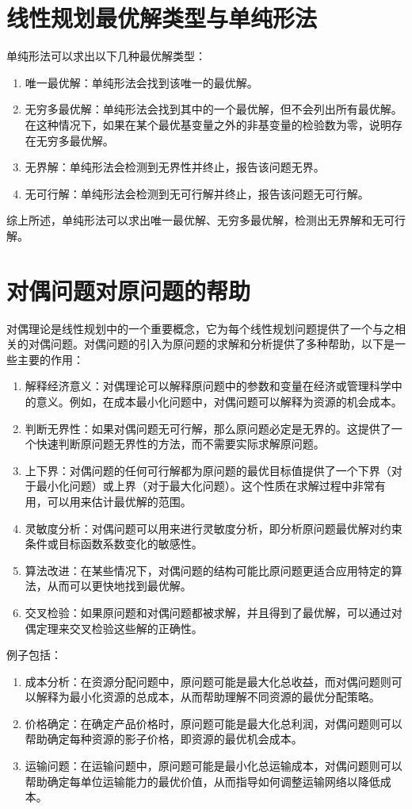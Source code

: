 \documentclass[12pt, a4paper, oneside]{ctexart}
\begin{document}
\section{线性规划最优解类型与单纯形法}
单纯形法可以求出以下几种最优解类型：

\begin{enumerate}[(1)]
  \item 唯一最优解：单纯形法会找到该唯一的最优解。
  \item 无穷多最优解：单纯形法会找到其中的一个最优解，但不会列出所有最优解。在这种情况下，如果在某个最优基变量之外的非基变量的检验数为零，说明存在无穷多最优解。
  \item 无界解：单纯形法会检测到无界性并终止，报告该问题无界。
  \item 无可行解：单纯形法会检测到无可行解并终止，报告该问题无可行解。
\end{enumerate}
综上所述，单纯形法可以求出唯一最优解、无穷多最优解，检测出无界解和无可行解。

\section{对偶问题对原问题的帮助}
对偶理论是线性规划中的一个重要概念，它为每个线性规划问题提供了一个与之相关的对偶问题。对偶问题的引入为原问题的求解和分析提供了多种帮助，以下是一些主要的作用：

\begin{enumerate}[(1)]
  \item 解释经济意义：对偶理论可以解释原问题中的参数和变量在经济或管理科学中的意义。例如，在成本最小化问题中，对偶问题可以解释为资源的机会成本。
  \item 判断无界性：如果对偶问题无可行解，那么原问题必定是无界的。这提供了一个快速判断原问题无界性的方法，而不需要实际求解原问题。
  \item 上下界：对偶问题的任何可行解都为原问题的最优目标值提供了一个下界（对于最小化问题）或上界（对于最大化问题）。这个性质在求解过程中非常有用，可以用来估计最优解的范围。
  \item 灵敏度分析：对偶问题可以用来进行灵敏度分析，即分析原问题最优解对约束条件或目标函数系数变化的敏感性。
  \item 算法改进：在某些情况下，对偶问题的结构可能比原问题更适合应用特定的算法，从而可以更快地找到最优解。
  \item 交叉检验：如果原问题和对偶问题都被求解，并且得到了最优解，可以通过对偶定理来交叉检验这些解的正确性。
\end{enumerate}
例子包括：

\begin{enumerate}[(1)]
  \item 成本分析：在资源分配问题中，原问题可能是最大化总收益，而对偶问题则可以解释为最小化资源的总成本，从而帮助理解不同资源的最优分配策略。
  \item 价格确定：在确定产品价格时，原问题可能是最大化总利润，对偶问题则可以帮助确定每种资源的影子价格，即资源的最优机会成本。
  \item 运输问题：在运输问题中，原问题可能是最小化总运输成本，对偶问题则可以帮助确定每单位运输能力的最优价值，从而指导如何调整运输网络以降低成本。
\end{enumerate}
\end{document}
